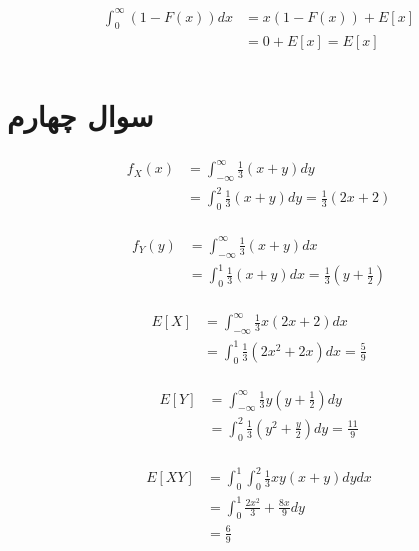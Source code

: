 \documentclass[paper=a4, fontsize=11pt]{article}
\numberwithin{equation}{section} %
\numberwithin{figure}{section} %
\numberwithin{table}{section} %
\begin{document}
\begin{align}
\begin{split}
    \int_{0}^{\infty} (1 - F(x))dx
    &= x(1 - F(x)) + E[x]\\
    &= 0 + E[x] = E[x]
\end{split}
\end{align}

\section{سوال چهارم}

\begin{align}
\begin{split}
    f_X(x) &= \int_{-\infty}^{\infty} \frac{1}{3}(x + y)dy \\
    &= \int_{0}^{2} \frac{1}{3}(x + y)dy = \frac{1}{3}(2x + 2)
\end{split}
\end{align}

\begin{align}
\begin{split}
    f_Y(y) &= \int_{-\infty}^{\infty} \frac{1}{3}(x + y)dx \\
    &= \int_{0}^{1} \frac{1}{3}(x + y)dx = \frac{1}{3}(y + \frac{1}{2})
\end{split}
\end{align}

\begin{align}
\begin{split}
    E[X] &= \int_{-\infty}^{\infty} \frac{1}{3}x(2x + 2)dx \\
    &= \int_{0}^{1} \frac{1}{3}(2x^2 + 2x)dx = \frac{5}{9}
\end{split}
\end{align}

\begin{align}
\begin{split}
    E[Y] &= \int_{-\infty}^{\infty} \frac{1}{3}y(y + \frac{1}{2})dy \\
    &= \int_{0}^{2} \frac{1}{3}(y^2 + \frac{y}{2})dy = \frac{11}{9}
\end{split}
\end{align}

\begin{align}
\begin{split}
    E[XY] &= \int_{0}^{1}\int_{0}^{2} \frac{1}{3}xy(x + y)dydx\\
    &= \int_{0}^{1} \frac{2x^2}{3} + \frac{8x}{9} dy\\
    &= \frac{6}{9}
\end{split}
\end{align}
\end{document}
